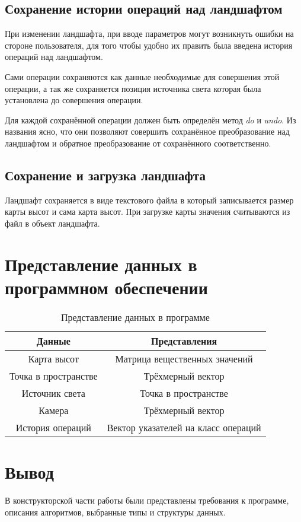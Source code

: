 \subsection{Сохранение истории операций над ландшафтом}
При изменении ландшафта, при вводе параметров могут возникнуть ошибки на стороне пользователя, для того чтобы удобно их править была введена история операций над ландшафтом.

Сами операции сохраняются как данные необходимые для совершения этой операции, а так же сохраняется позиция источника света которая была установлена до совершения операции.

Для каждой сохранённой операции должен быть определён метод \textit{do} и \textit{undo}. Из названия ясно, что они позволяют совершить сохранённое преобразование над ландшафтом и обратное преобразование от сохранённого соответственно.

\subsection{Сохранение и загрузка ландшафта}

Ландшафт сохраняется в виде текстового файла в который записывается размер карты высот и сама карта высот. При загрузке карты значения считываются из файл в объект ландшафта.

\section{Представление данных в программном обеспечении}

\begin{table}[H]
	\begin{center}
		\begin{threeparttable}
			\caption{Представление данных в программе}
			\label{tbl:data}
			\begin{tabular}{|c|c|}
				\hline
				\bfseries{Данные} & \bfseries{Представления} \\
				\hline
				Карта высот &  Матрица вещественных значений \\
				\hline
				Точка в пространстве & Трёхмерный вектор \\
				\hline
				Источник света & Точка в пространстве \\
				\hline
				Камера & Трёхмерный вектор \\
				\hline
				История операций & Вектор указателей на класс операций \\ 
				\hline
				
			\end{tabular}	
		\end{threeparttable}
	\end{center}
\end{table}

\section*{Вывод}

В конструкторской части работы были представлены требования к программе, описания алгоритмов, выбранные типы и структуры данных.
